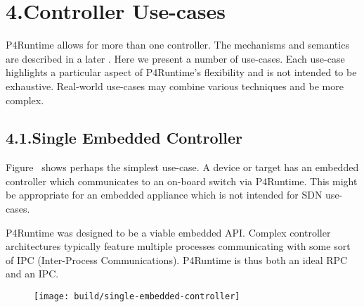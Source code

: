 \documentclass[11pt]{article}
\begin{document}
{%
\section{4.\hspace*{0.5em}Controller Use-cases}\label{sec-controller-use-cases}%

\noindent{}P4Runtime allows for more than one controller. The mechanisms and semantics are
described in a later
. Here we
present a number of use-cases. Each use-case highlights a particular aspect of
P4Runtime's flexibility and is not intended to be exhaustive. Real-world
use-cases may combine various techniques and be more complex.%

\subsection{4.1.\hspace*{0.5em}Single Embedded Controller}\label{sec-single-embedded-controller}%

\noindent{}Figure~ shows perhaps the simplest use-case. A
device or target has an embedded controller which communicates to an on-board
switch via P4Runtime. This might be appropriate for an embedded appliance which
is not intended for SDN use-cases.%

P4Runtime was designed to be a viable embedded API. Complex controller
architectures typically feature multiple processes communicating with some sort
of IPC (Inter-Process Communications). P4Runtime is thus both an ideal RPC and
an IPC.%

\begin{figure}[tbp]%
\begin{mdcenter}%

\noindent{}\texttt{[image: build/single-embedded-controller]}{}%

\mdhr{}%

\noindent{}%
\end{mdcenter}\label{fig-single-embedded-controller}%
\end{figure}%

}
\end{document}
